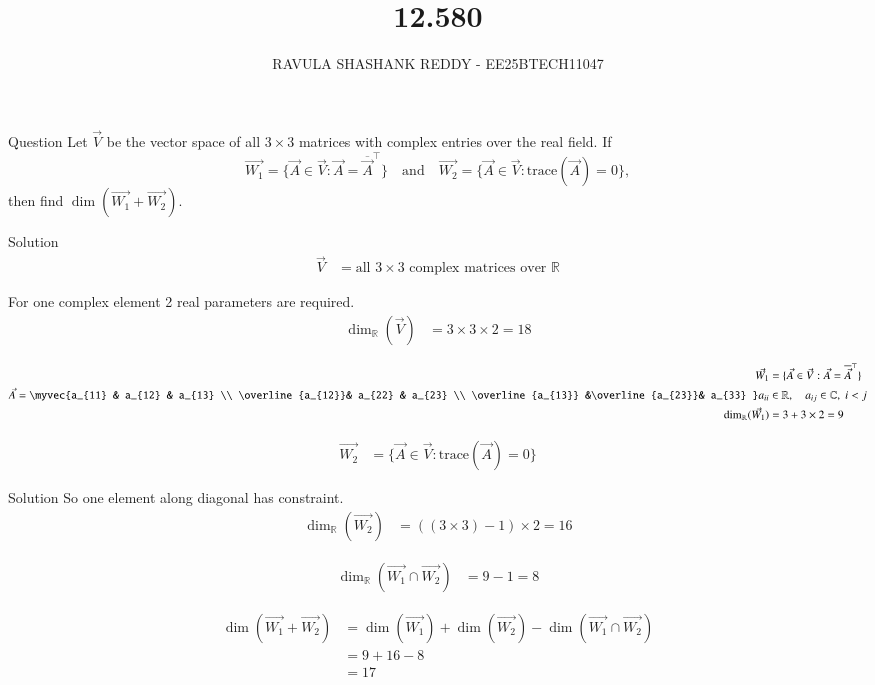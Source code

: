\documentclass{beamer}
\title %
{12.580}
\author %
{RAVULA SHASHANK REDDY - EE25BTECH11047}
\begin{document}
	
	
	\frame{\titlepage}
	\begin{frame}{Question}
    Let \(\vec{V}\) be the vector space of all \(3 \times 3\) matrices with complex entries over the real field. If  
\[
\vec{W_1} = \{\vec{A} \in \vec{V} : \vec{A} = \overline{\vec{A}}^\top \} \quad \text{and} \quad \vec{W_2} = \{\vec{A} \in \vec{V} : \mathrm{trace}(\vec{A}) = 0\},
\]  
then find \(\dim(\vec{W_1} + \vec{W_2})\).
\end{frame}
\begin{frame}{Solution}
    \begin{align}
\vec{V} &= \text{all } 3 \times 3 \text{ complex matrices over } \mathbb{R} 
\end{align}

For one complex element 2 real parameters are required.
\begin{align}
\dim_\mathbb{R}(\vec{V}) &= 3 \times 3 \times 2 = 18
\end{align}

\begin{align}
\vec{W_1} &= \{\vec{A} \in \vec{V}: \vec{A} = \overline{\vec{A}}^\top \} \\
\vec{A} = \myvec{a_{11} & a_{12} & a_{13} \\
\overline{a_{12}}& a_{22} & a_{23} \\
\overline{a_{13}} &\overline{a_{23}}& a_{33} }
a_{ii} &\in \mathbb{R}, \quad a_{ij} \in \mathbb{C}, \; i<j \\
\dim_\mathbb{R}(\vec{W_1}) &= 3 + 3 \times 2 = 9
\end{align}

\begin{align}
\vec{W_2} &= \{\vec{A} \in \vec{V}: \mathrm{trace}(\vec{A}) = 0\} 
\end{align}
\end{frame}
\begin{frame}{Solution}
So one element along diagonal has constraint.
\begin{align}
\dim_\mathbb{R}(\vec{W_2}) &= ((3 \times 3)-1) \times 2  = 16
\end{align}

\begin{align}
\dim_\mathbb{R}(\vec{W_1} \cap \vec{W_2}) &= 9 - 1 = 8
\end{align}

\begin{align}
\dim(\vec{W_1} + \vec{W_2}) &= \dim(\vec{W_1}) + \dim(\vec{W_2}) - \dim(\vec{W_1} \cap \vec{W_2}) \\
&= 9 + 16 - 8 \\
&= 17
\end{align}
\end{frame}
\end{document}
